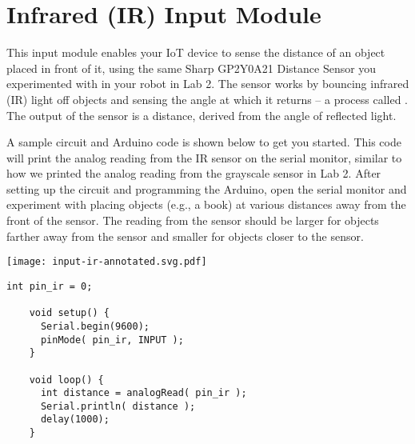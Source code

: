 
\section{Infrared (IR) Input Module}
\label{sec-input-ir}

This input module enables your IoT device to sense the distance of an
object placed  in front of it, using the same Sharp
GP2Y0A21 Distance Sensor you experimented with in your robot in Lab 2.
The sensor works by bouncing infrared (IR) light off objects and sensing
the angle at which it returns -- a process called .
The output of the sensor is a distance, derived from the angle of
reflected light.

A sample circuit and Arduino code is shown below to get you started.
This code will print the analog reading from the IR sensor on the serial
monitor, similar to how we printed the analog reading from the grayscale
sensor in Lab 2. After setting up the circuit and programming the
Arduino, open the serial monitor and experiment with placing objects
(e.g., a book) at various distances away from the front of the sensor.
The reading from the sensor should be larger for objects farther away
from the sensor and smaller for objects closer to the sensor.


\vspace{0.1in}
\begin{minipage}[t]{0.49\tw}
  \vspace{0pt}

  \texttt{[image: input-ir-annotated.svg.pdf]}
\end{minipage}
\hfill
\begin{minipage}[t]{0.49\tw}
  \vspace{0.1in}
  \begin{Verbatim}[gobble=3,fontsize=\small]
    int pin_ir = 0;

    void setup() {
      Serial.begin(9600);
      pinMode( pin_ir, INPUT );
    }

    void loop() {
      int distance = analogRead( pin_ir );
      Serial.println( distance );
      delay(1000);
    }
  \end{Verbatim}
\end{minipage}

